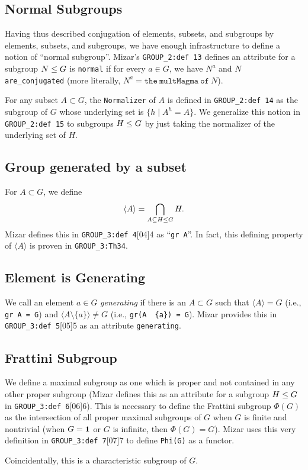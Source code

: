 \subsection{Normal Subgroups}
Having thus described conjugation of elements, subsets, and subgroups by
elements, subsets, and subgroups, we have enough infrastructure to
define a notion of ``normal subgroup''. Mizar's
\verb#GROUP_2:def 13# defines an attribute for a subgroup
$N\leq G$ is \verb#normal# if for
every $a\in G$, we have $N^{a}$ and $N$ \verb#are_conjugated# (more
literally, $N^{a} = \mathtt{the~multMagma~of~}N$).

For any subset $A\subset G$, the \verb#Normalizer# of $A$ is defined in
\verb#GROUP_2:def 14# as the subgroup of $G$ whose
underlying set is $\{h \mid A^{h} = A\}$. We generalize this notion in
\verb#GROUP_2:def 15# to subgroups $H\leq G$ by just taking the
normalizer of the underlying set of $H$.

\subsection{Group generated by a subset}
For $A\subset G$, we define
\begin{equation}
\langle A\rangle = \bigcap_{A\subseteq H\leq G} H.
\end{equation}
Mizar defines this in \verb#GROUP_3:def 4#[04]{4} as
``\verb#gr A#''. In fact, this defining
property of $\langle A\rangle$ is proven in
\verb#GROUP_3:Th34#.

\subsection{Element is Generating}
We call an element $a\in G$ \emph{generating} if there is an $A\subset G$
such that $\langle A\rangle = G$ (i.e., \texttt{gr A = G}) and
$\langle A\setminus\{a\}\rangle\neq G$ (i.e., \texttt{gr(A \ \{a\}) = G}).
Mizar provides this in \verb#GROUP_3:def 5#[05]{5} as
an attribute \verb#generating#.

\subsection{Frattini Subgroup}
We define a maximal subgroup as one which is proper and not contained in
any other proper subgroup (Mizar defines this as an attribute for a
subgroup $H\leq G$ in \verb#GROUP_3:def 6#[06]{6}).
This is necessary to define the Frattini subgroup $\Phi(G)$ as the
intersection of all proper maximal subgroups of $G$ when $G$ is finite
and nontrivial (when $G=\mathbf{1}$ or $G$ is infinite, then
$\Phi(G)=G$). Mizar uses this very definition in
\verb#GROUP_3:def 7#[07]{7} to define \texttt{Phi(G)}
as a functor.

Coincidentally, this is a characteristic subgroup of $G$.
